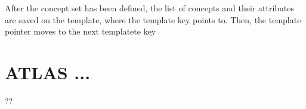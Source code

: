 
After the concept set has been defined, the list of concepts and their attributes are saved on the template, where the template key points to. Then, the template pointer moves to the next templatete key

\section{ATLAS ...}

??


